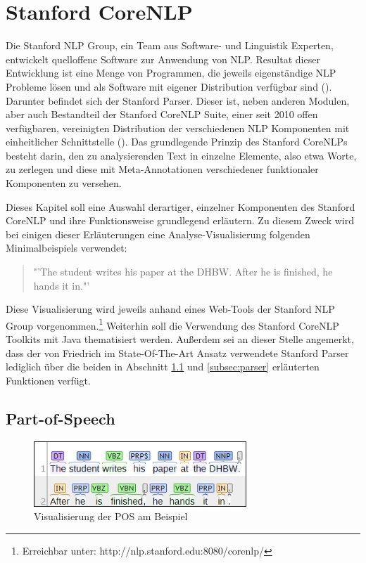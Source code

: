 \section{Stanford CoreNLP}
\label{sec:stanfordparser}

Die Stanford \ac{NLP} Group, ein Team aus Software- und Linguistik Experten, entwickelt quelloffene Software zur Anwendung von \ac{NLP}. Resultat dieser Entwicklung ist eine Menge von Programmen, die jeweils eigenständige \ac{NLP} Probleme lösen und als Software mit eigener Distribution verfügbar sind (\cite[vgl.][1 ff.]{STANFORDNLPTEAM}).  Darunter befindet sich der Stanford Parser. Dieser ist, neben anderen Modulen, aber auch Bestandteil der Stanford CoreNLP Suite, einer seit 2010 offen verfügbaren, vereinigten Distribution der verschiedenen \ac{NLP} Komponenten mit einheitlicher Schnittstelle (\cite[vgl.][1 ff.]{STANFORDNLP}). Das grundlegende Prinzip des Stanford CoreNLPs besteht darin, den zu analysierenden Text in einzelne Elemente, also etwa Worte, zu zerlegen und diese mit Meta-Annotationen verschiedener funktionaler Komponenten zu versehen.\par
Dieses Kapitel soll eine Auswahl derartiger, einzelner Komponenten des Stanford CoreNLP und ihre Funktionsweise grundlegend erläutern. Zu diesem Zweck wird bei einigen dieser Er\-läu\-ter\-ung\-en eine Analyse-Visualisierung folgenden Minimalbeispiels verwendet:
\begin{quote}
"'The student writes his paper at the DHBW. After he is finished, he hands it in."'
\end{quote} Diese Visualisierung wird jeweils anhand eines Web-Tools der Stanford \ac{NLP} Group vorgenommen.\footnote{Erreichbar unter: http://nlp.stanford.edu:8080/corenlp/} Weiterhin soll die Verwendung des Stanford CoreNLP Toolkits mit Java thematisiert werden. Außerdem sei an dieser Stelle angemerkt, dass der von Friedrich im State-Of-The-Art Ansatz verwendete Stanford Parser lediglich über die beiden in Abschnitt \ref{subsec:pos} und \ref{subsec:parser} erläuterten Funktionen verfügt.
\newpage
\subsection{Part-of-Speech}
\label{subsec:pos}

\begin{figure}
\includegraphics[width=8cm]{pictures/POS.png}
\caption{Visualisierung der POS am Beispiel}
\label{fig:POS}
\end{figure}

